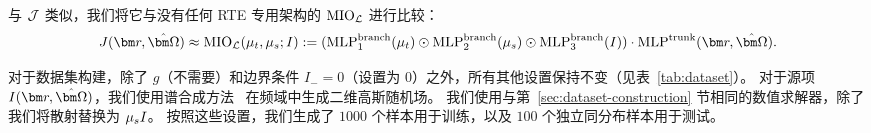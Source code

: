 与 $\mathcal{J}$ 类似，我们将它与没有任何 RTE 专用架构的 $\text{MIO}_{\mathcal{L}}$ 进行比较：
\begin{equation}
    J(\br,\bOmega) \approx \text{MIO}_{\cL}(\mut,\mus;I) := (\text{MLP}^{\text{branch}}_1(\mut)\odot\text{MLP}^{\text{branch}}_2(\mus)\odot\text{MLP}^{\text{branch}}_3(I))\cdot \text{MLP}^{\text{trunk}}(\br,\bOmega).
\end{equation}

对于数据集构建，除了 $g$（不需要）和边界条件 $I_- = 0$（设置为 0）之外，所有其他设置保持不变（见表~\ref{tab:dataset}）。
对于源项 $I(\br,\bOmega)$，我们使用谱合成方法~\cite{liu2019advances, ruan1998efficient} 在频域中生成二维高斯随机场。
我们使用与第~\ref{sec:dataset-construction} 节相同的数值求解器，除了我们将散射替换为 $\mu_s I$。
按照这些设置，我们生成了 $1000$ 个样本用于训练，以及 $100$ 个独立同分布样本用于测试。

